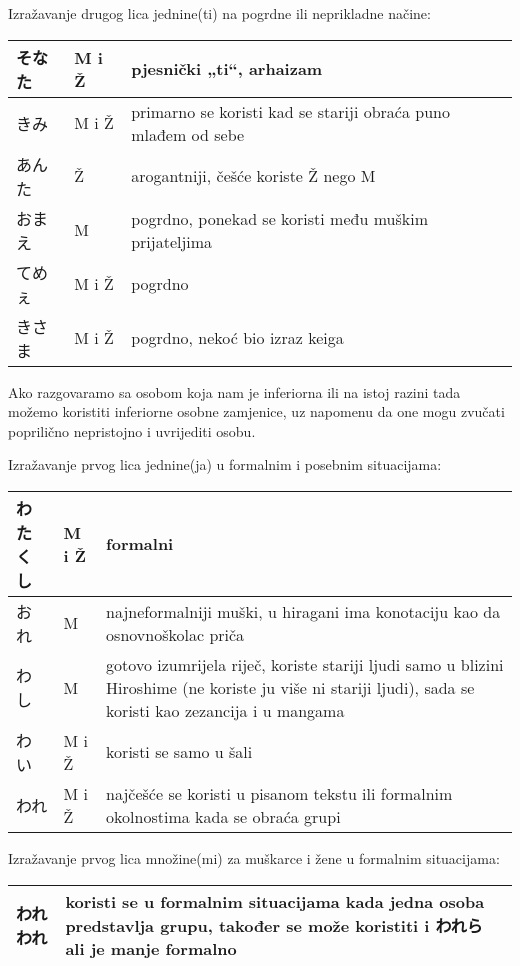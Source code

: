 	Izražavanje drugog lica jednine(ti) na pogrdne ili neprikladne načine: 
	\begin{table}[!h]
	\begin{tabular}{|l|l|l|}
		\hline
		そなた			&M i Ž	&pjesnički „ti“, arhaizam\\\hline
		きみ\footnotemark[2]	&M i Ž	&primarno se koristi kad se stariji obraća puno mlađem od sebe\\\hline
		あんた			&Ž	&arogantniji, češće koriste Ž nego M\\\hline
		おまえ			&M	&pogrdno, ponekad se koristi među muškim prijateljima\\\hline
		てめぇ			&M i Ž 	&pogrdno\\\hline
		きさま			&M i Ž 	&pogrdno, nekoć bio izraz keiga\\\hline
	\end{tabular}
	\end{table}
	
	
		Ako razgovaramo sa osobom koja nam je inferiorna ili na istoj razini tada možemo koristiti inferiorne osobne zamjenice, uz napomenu da one mogu zvučati poprilično nepristojno i uvrijediti osobu.
		
	Izražavanje prvog lica jednine(ja) u formalnim i posebnim situacijama: 
	\begin{table}[!h]	
	\begin{tabular}{|l|l|p{400pt}|}
		\hline
		わたくし	&M i Ž	&formalni\\\hline
		おれ		&M	&najneformalniji muški, u hiragani ima konotaciju kao da osnovnoškolac priča\\\hline
		わし		&M	&gotovo izumrijela riječ, koriste stariji ljudi samo u blizini Hiroshime (ne koriste ju više ni stariji ljudi), sada se koristi kao zezancija i u mangama\\\hline
		わい		&M i Ž 	&koristi se samo u šali\\\hline
		われ		&M i Ž	&najčešće se koristi u pisanom tekstu ili formalnim okolnostima kada se obraća grupi\\\hline
	\end{tabular}
	\end{table}


	Izražavanje prvog lica množine(mi) za muškarce i žene u formalnim situacijama:
	\begin{table}[!h]
		\begin{tabular}{|l|p{400pt}|}
		\hline
		われわれ&koristi se u formalnim situacijama kada jedna osoba predstavlja grupu, također se može koristiti i われら ali je manje formalno\\\hline
	\end{tabular}
	\end{table}

